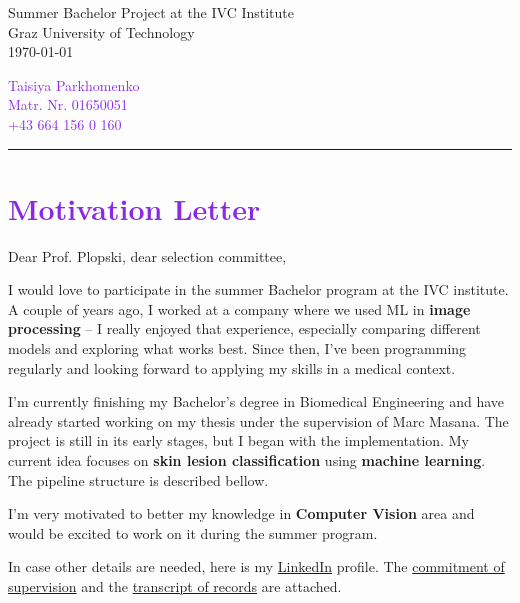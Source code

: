 \documentclass[11pt,a4paper]{article}
\begin{document}

\noindent
\begin{minipage}[t]{0.6\textwidth}
    \raggedright
    Summer Bachelor Project at the IVC Institute\\
    Graz University of Technology\\
    \today
\end{minipage}%
\hfill
\begin{minipage}[t]{0.3\textwidth}
    \raggedleft
    \textcolor{BlueViolet}{Taisiya Parkhomenko\\
    Matr. Nr. 01650051\\
    +43 664 156 0 160}
\end{minipage}

\vspace{0.5cm}
\hrule

\section*{\textcolor{BlueViolet}{Motivation Letter}}
\vspace{0.7cm}
Dear Prof. Plopski, dear selection committee,

\vspace{0.5cm}
I would love to participate in the summer Bachelor program at the IVC institute. A couple of years ago, I worked at a company where we used ML in \textbf{image processing} – I really enjoyed that experience, especially comparing different models and exploring what works best. Since then, I've been programming regularly and looking forward to applying my skills in a medical context.

I'm currently finishing my Bachelor's degree in Biomedical Engineering and have already started working on my thesis under the supervision of Marc Masana.
The project is still in its early stages, but I began with the implementation. My current idea focuses on \textbf{skin lesion classification} using \textbf{machine learning}. The pipeline structure is described bellow.

I'm very motivated to better my knowledge in \textbf{Computer Vision} area and would be excited to work on it during the summer program. 

In case other details are needed, here is my \href{https://www.linkedin.com/in/taisiya-parkhomenko-937336167/}{LinkedIn} profile. 
The \hyperlink{commitment}{commitment of supervision} and the \hyperlink{transcript}{transcript of records} are attached.
\end{document}
